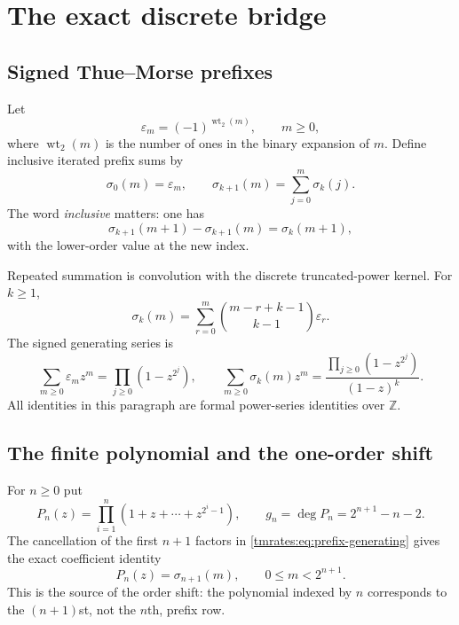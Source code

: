 \documentclass[11pt,oneside]{article}
\theoremstyle{definition}
\theoremstyle{remark}
\newcommand{\Z}{\mathbb Z}
\newcommand{\wt}{\operatorname{wt}_2}
\begin{document}
\section{The exact discrete bridge}
\label{tmrates:sec:bridge}

\subsection{Signed Thue--Morse prefixes}

Let
\begin{equation}
 \varepsilon_m=(-1)^{\wt(m)},\qquad m\ge0,                 \label{tmrates:eq:tm-sign}
\end{equation}
where $\wt(m)$ is the number of ones in the binary expansion of $m$.  Define inclusive
iterated prefix sums by
\begin{equation}
 \sigma_0(m)=\varepsilon_m,
 \qquad
 \sigma_{k+1}(m)=\sum_{j=0}^{m}\sigma_k(j).                \label{tmrates:eq:prefix-def}
\end{equation}
The word \emph{inclusive} matters: one has
\begin{equation}
 \sigma_{k+1}(m+1)-\sigma_{k+1}(m)=\sigma_k(m+1),          \label{tmrates:eq:forward-difference}
\end{equation}
with the lower-order value at the new index.

Repeated summation is convolution with the discrete truncated-power kernel.  For $k\ge1$,
\begin{equation}
 \sigma_k(m)=\sum_{r=0}^{m}\binom{m-r+k-1}{k-1}\varepsilon_r. \label{tmrates:eq:prefix-convolution}
\end{equation}
The signed generating series is
\begin{equation}
 \sum_{m\ge0}\varepsilon_m z^m=\prod_{j\ge0}(1-z^{2^j}),
 \qquad
 \sum_{m\ge0}\sigma_k(m)z^m
 =\frac{\prod_{j\ge0}(1-z^{2^j})}{(1-z)^k}.               \label{tmrates:eq:prefix-generating}
\end{equation}
All identities in this paragraph are formal power-series identities over $\Z$.

\subsection{The finite polynomial and the one-order shift}

For $n\ge0$ put
\begin{equation}
 P_n(z)=\prod_{i=1}^{n}(1+z+\cdots+z^{2^i-1}),
 \qquad
 g_n=\deg P_n=2^{n+1}-n-2.                                \label{tmrates:eq:Pn}
\end{equation}
The cancellation of the first $n+1$ factors in \eqref{tmrates:eq:prefix-generating} gives the exact
coefficient identity
\begin{equation}
 [z^m]P_n(z)=\sigma_{n+1}(m),
 \qquad 0\le m<2^{n+1}.                                   \label{tmrates:eq:coefficient-bridge}
\end{equation}
This is the source of the order shift: the polynomial indexed by $n$ corresponds to the
$(n+1)$st, not the $n$th, prefix row.
\end{document}
